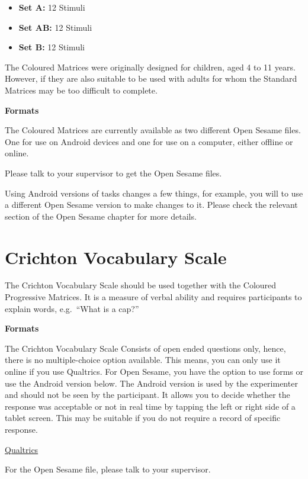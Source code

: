 \documentclass[
]{book}
\providecommand{\tightlist}{%
  \setlength{\itemsep}{0pt}\setlength{\parskip}{0pt}}
\begin{document}
\begin{itemize}
\tightlist
\item
  \textbf{Set A:} 12 Stimuli
\item
  \textbf{Set AB:} 12 Stimuli
\item
  \textbf{Set B:} 12 Stimuli
\end{itemize}

The Coloured Matrices were originally designed for children, aged 4 to 11 years. However, if they are also suitable to be used with adults for whom the Standard Matrices may be too difficult to complete.

\textbf{Formats}

The Coloured Matrices are currently available as two different Open Sesame files. One for use on Android devices and one for use on a computer, either offline or online.

Please talk to your supervisor to get the Open Sesame files.

Using Android versions of tasks changes a few things, for example, you will to use a different Open Sesame version to make changes to it. Please check the relevant section of the Open Sesame chapter for more details.

\hypertarget{crichton-vocabulary-scale}{%
\section{Crichton Vocabulary Scale}\label{crichton-vocabulary-scale}}

The Crichton Vocabulary Scale should be used together with the Coloured Progressive Matrices. It is a measure of verbal ability and requires participants to explain words, e.g.~``What is a cap?''

\textbf{Formats}

The Crichton Vocabulary Scale Consists of open ended questions only, hence, there is no multiple-choice option available. This means, you can only use it online if you use Qualtrics. For Open Sesame, you have the option to use forms or use the Android version below.
The Android version is used by the experimenter and should not be seen by the participant. It allows you to decide whether the response was acceptable or not in real time by tapping the left or right side of a tablet screen. This may be suitable if you do not require a record of specific response.

\href{link\%20here}{Qualtrics}

For the Open Sesame file, please talk to your supervisor.
\end{document}
